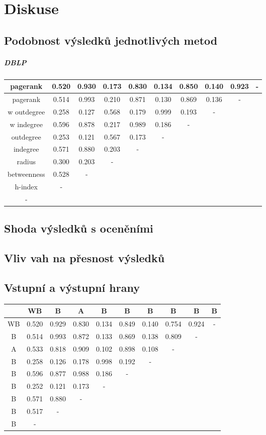 \documentclass[12pt,titlepage]{report}
\begin{document}
\chapter{Diskuse}
\section{Podobnost výsledků jednotlivých metod}
\paragraph{DBLP}
\begin{tabular}{|c|c|c|c|c|c|c|c|c|c|}
\hline
pagerank & 0.520 & 0.930 & 0.173 & 0.830 & 0.134 & 0.850 & 0.140 & 0.923 & - \\ 
\hline
pagerank & 0.514 & 0.993 & 0.210 & 0.871 & 0.130 & 0.869 & 0.136 & - \\ \cline{1-9}
w outdegree & 0.258 & 0.127 & 0.568 & 0.179 & 0.999 & 0.193 & - \\ \cline{1-8}
w indegree & 0.596 & 0.878 & 0.217 & 0.989 & 0.186 & - \\ \cline{1-7}
outdegree & 0.253 & 0.121 & 0.567 & 0.173 & - \\ \cline{1-6}
indegree & 0.571 & 0.880 & 0.203 & - \\ \cline{1-5}
radius & 0.300 & 0.203 & - \\ \cline{1-4}
betweenness & 0.528 & - \\ \cline{1-3}
h-index &  - \\ \cline{1-2}
 - \\ \cline{1-1}
\end{tabular}
\section{Shoda výsledků s oceněními}
\section{Vliv vah na přesnost výsledků}
\section{Vstupní a výstupní hrany}
\begin{tabular}{|c|c|c|c|c|c|c|c|c|c|}
\hline
   & WB & B & A & B & B & B & B & B & B \\
\hline
WB & 0.520 & 0.929 & 0.830 & 0.134 & 0.849 & 0.140 & 0.754 & 0.924 & - \\
\hline
B  & 0.514 & 0.993 & 0.872 & 0.133 & 0.869 & 0.138 & 0.809 & - \\
\cline{1-9}
A  & 0.533 & 0.818 & 0.909 & 0.102 & 0.898 & 0.108 & - \\
\cline{1-8}
B  & 0.258 & 0.126 & 0.178 & 0.998 & 0.192 & - \\
\cline{1-7}
B  & 0.596 & 0.877 & 0.988 & 0.186 & - \\
\cline{1-6}
B  & 0.252 & 0.121 & 0.173 & - \\
\cline{1-5}
B  & 0.571 & 0.880 & - \\
\cline{1-4}
B  & 0.517 & - \\
\cline{1-3}
B  &  - \\
\cline{1-2}
\end{tabular}
\end{document}
